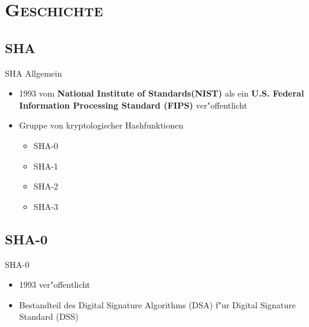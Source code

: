 \documentclass[xcolor=x11names,compress]{beamer}
\renewcommand{\(}{\begin{columns}}
\renewcommand{\)}{\end{columns}}
\newcommand{\<}[1]{\begin{column}{#1}}
\renewcommand{\>}{\end{column}}
\begin{document}
\section{\scshape Geschichte}
\subsection{SHA}
\begin{frame}{SHA Allgemein}
\begin{itemize}


\item 1993 vom {\bf National Institute of Standards(NIST)} 
als ein {\bf U.S. Federal Information Processing Standard (FIPS)} 
ver"offentlicht

	\pause
\item Gruppe von kryptologischer Hashfunktionen
	\begin{itemize}
		\item SHA-0	
		\item SHA-1
		\item SHA-2
		\item SHA-3
	\end{itemize}

\end{itemize}
\end{frame}

\subsection{SHA-0}
\begin{frame}{SHA-0}
\begin{itemize}
\item 1993 ver"offentlicht
	\pause
\item Bestandteil des Digital Signature Algorithms (DSA) f"ur Digital Signature Standard (DSS) %

\end{itemize}
\end{frame}

\end{document}
